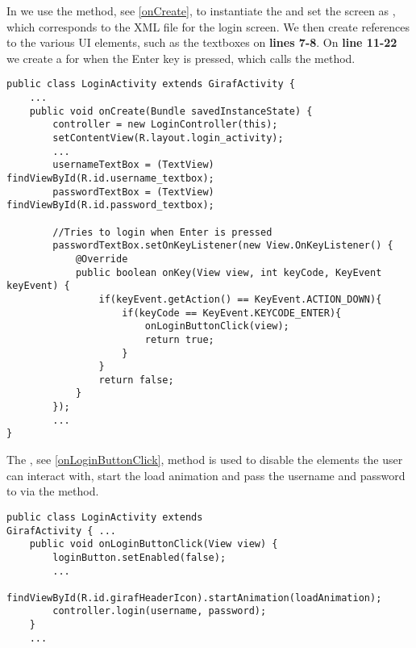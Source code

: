 In  we use the  method, see
\autoref{onCreate}, to instantiate the  and set the
screen as , which corresponds to the XML
file for the login screen. We then create references to the various UI elements,
such as the textboxes on \textbf{lines 7-8}. On \textbf{line 11-22} we create a
 for when the Enter key is pressed, which calls the
 method.\nl

\begin{minipage}[H]{\linewidth}
\begin{lstlisting}[caption = Creating the correct references when logging in,
label = onCreate] public class LoginActivity extends GirafActivity {
	...
	public void onCreate(Bundle savedInstanceState) {
		controller = new LoginController(this);
    	setContentView(R.layout.login_activity);
		...
        usernameTextBox = (TextView) findViewById(R.id.username_textbox);
        passwordTextBox = (TextView) findViewById(R.id.password_textbox);
        
        //Tries to login when Enter is pressed
        passwordTextBox.setOnKeyListener(new View.OnKeyListener() {
            @Override
            public boolean onKey(View view, int keyCode, KeyEvent keyEvent) {
                if(keyEvent.getAction() == KeyEvent.ACTION_DOWN){
                    if(keyCode == KeyEvent.KEYCODE_ENTER){
                        onLoginButtonClick(view);
                        return true;
                    }
                }
                return false;
            }
        });
        ...
}
\end{lstlisting}
\end{minipage}

The , see \autoref{onLoginButtonClick}, method is used
to disable the elements the user can interact with, start the load animation and
pass the username and password to  via the 
method.\nl

\begin{minipage}[H]{\linewidth}
\begin{lstlisting}[caption = Passes the user information and begins the waiting
animation, label = onLoginButtonClick] public class LoginActivity extends
GirafActivity { ...
	public void onLoginButtonClick(View view) {
        loginButton.setEnabled(false);
 		...
        findViewById(R.id.girafHeaderIcon).startAnimation(loadAnimation);
        controller.login(username, password);
    }
	...
\end{lstlisting}
\end{minipage}

